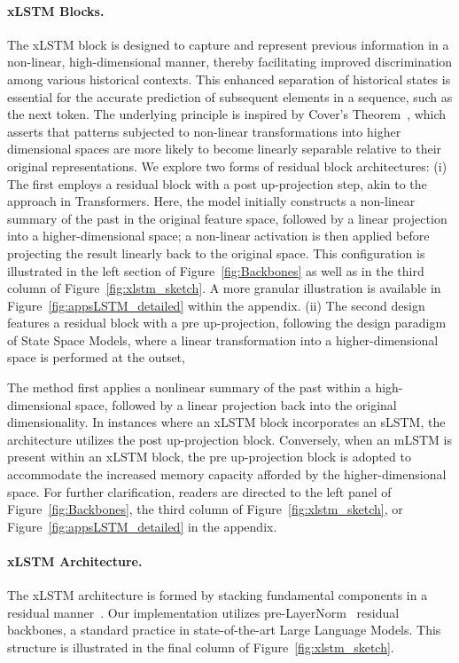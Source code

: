 \paragraph{xLSTM Blocks.}
\label{sec:xLSTMblock}
The xLSTM block is designed to capture and represent previous information in a non-linear, high-dimensional manner, thereby facilitating improved discrimination among various historical contexts. This enhanced separation of historical states is essential for the accurate prediction of subsequent elements in a sequence, such as the next token. The underlying principle is inspired by Cover’s Theorem~\citep{Cover:65}, which asserts that patterns subjected to non-linear transformations into higher dimensional spaces are more likely to become linearly separable relative to their original representations. We explore two forms of residual block architectures: (i) The first employs a residual block with a post up-projection step, akin to the approach in Transformers. Here, the model initially constructs a non-linear summary of the past in the original feature space, followed by a linear projection into a higher-dimensional space; a non-linear activation is then applied before projecting the result linearly back to the original space. This configuration is illustrated in the left section of Figure~\ref{fig:Backbones}
as well as in the third column of Figure~\ref{fig:xlstm_sketch}. A more granular illustration is available in Figure~\ref{fig:appsLSTM_detailed}
within the appendix. (ii) The second design features a residual block with a pre up-projection, following the design paradigm of State Space Models, where a linear transformation into a higher-dimensional space is performed at the outset,

The method first applies a nonlinear summary of the past within a high-dimensional space, followed by a linear projection back into the original dimensionality. In instances where an xLSTM block incorporates an sLSTM, the architecture utilizes the post up-projection block. Conversely, when an mLSTM is present within an xLSTM block, the pre up-projection block is adopted to accommodate the increased memory capacity afforded by the higher-dimensional space. For further clarification, readers are directed to the left panel of Figure~\ref{fig:Backbones}, the third column of Figure~\ref{fig:xlstm_sketch}, or Figure~\ref{fig:appsLSTM_detailed} in the appendix.

\paragraph{xLSTM Architecture. }
\label{sec:xLSTMarchitecure}
The xLSTM architecture is formed by stacking fundamental components in a residual manner~\citep{Srivastava:15,He:16}. Our implementation utilizes pre-LayerNorm~\citep{Ba:16b} residual backbones, a standard practice in state-of-the-art Large Language Models. This structure is illustrated in the final column of Figure~\ref{fig:xlstm_sketch}.

